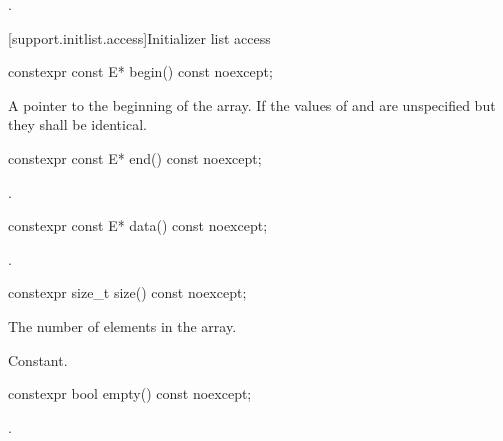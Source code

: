 \begin{itemdescr}
\pnum
\ensures
{}.
\end{itemdescr}

[support.initlist.access]{Initializer list access}

%
\begin{itemdecl}
constexpr const E* begin() const noexcept;
\end{itemdecl}

\begin{itemdescr}
\pnum
\returns
A pointer to the beginning of the array. If  the
values of  and  are unspecified but they shall be
identical.
\end{itemdescr}

%
\begin{itemdecl}
constexpr const E* end() const noexcept;
\end{itemdecl}

\begin{itemdescr}
\pnum
\returns
{}.
\end{itemdescr}

%
\begin{itemdecl}
constexpr const E* data() const noexcept;
\end{itemdecl}

\begin{itemdescr}
\pnum
\returns
{}.
\end{itemdescr}

%
\begin{itemdecl}
constexpr size_t size() const noexcept;
\end{itemdecl}

\begin{itemdescr}
\pnum
\returns
The number of elements in the array.

\pnum
\complexity
Constant.
\end{itemdescr}

%
\begin{itemdecl}
constexpr bool empty() const noexcept;
\end{itemdecl}

\begin{itemdescr}
\pnum
\returns
{}.
\end{itemdescr}


